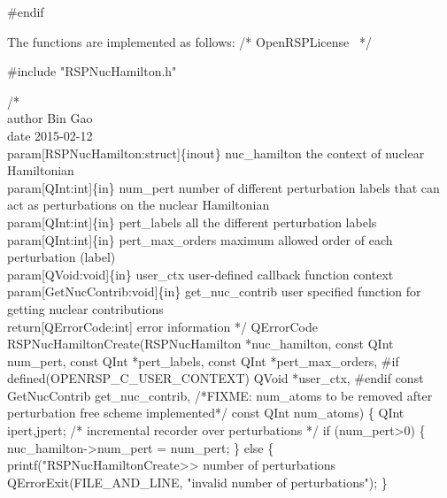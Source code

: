 #endif
\nwendcode{}\nwdocspar

The functions are implemented as follows:
\nwenddocs{}\endmoddef
/*
  \LA{}OpenRSPLicense~{\nwtagstyle{}}\RA{}
*/

#include "RSPNucHamilton.h"

/*%
    \\author Bin Gao
    \\date 2015-02-12
    \\param[RSPNucHamilton:struct]\{inout\} nuc_hamilton the context of nuclear Hamiltonian
    \\param[QInt:int]\{in\} num_pert number of different perturbation labels that can
        act as perturbations on the nuclear Hamiltonian
    \\param[QInt:int]\{in\} pert_labels all the different perturbation labels
    \\param[QInt:int]\{in\} pert_max_orders maximum allowed order of each perturbation (label)
    \\param[QVoid:void]\{in\} user_ctx user-defined callback function context
    \\param[GetNucContrib:void]\{in\} get_nuc_contrib user specified function for
        getting nuclear contributions
    \\return[QErrorCode:int] error information
*/
QErrorCode RSPNucHamiltonCreate(RSPNucHamilton *nuc_hamilton,
                                const QInt num_pert,
                                const QInt *pert_labels,
                                const QInt *pert_max_orders,
#if defined(OPENRSP_C_USER_CONTEXT)
                                QVoid *user_ctx,
#endif
                                const GetNucContrib get_nuc_contrib,
/*FIXME: num_atoms to be removed after perturbation free scheme implemented*/
                                const QInt num_atoms)
\{
    QInt ipert,jpert;  /* incremental recorder over perturbations */
    if (num_pert>0) \{
        nuc_hamilton->num_pert = num_pert;
    \}
    else \{
        printf("RSPNucHamiltonCreate>> number of perturbations %
        QErrorExit(FILE_AND_LINE, "invalid number of perturbations");
    \}
